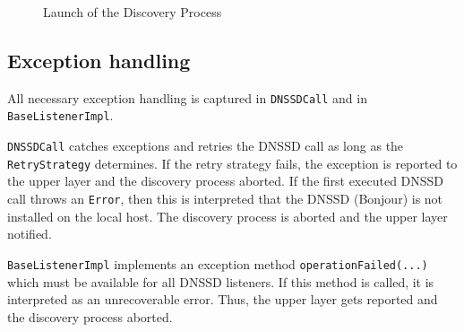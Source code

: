 \begin{figure}[H]
 \centering
 \caption{Launch of the Discovery Process}
 \label{fig:network.discovery.launch}
\end{figure}


\subsection{Exception handling}
All necessary exception handling is captured in \texttt{DNSSDCall} and in \texttt{BaseListenerImpl}. 

\texttt{DNSSDCall} catches exceptions and retries the DNSSD call as long as the \texttt{RetryStrategy} determines. If the retry strategy fails, the exception is reported to the upper layer and the discovery process aborted. If the first executed DNSSD call throws an \texttt{Error}, then this is interpreted that the DNSSD (Bonjour) is not installed on the local host. The discovery process is aborted and the upper layer notified.

\texttt{BaseListenerImpl} implements an exception method \texttt{operationFailed(...)} which must be available for all DNSSD listeners. If this method is called, it is interpreted as an unrecoverable error. Thus, the upper layer gets reported and the discovery process aborted.

